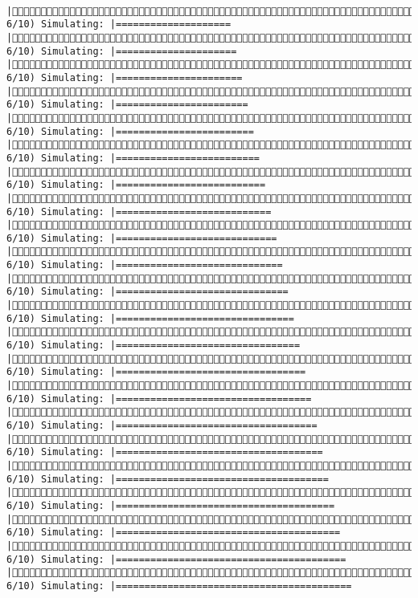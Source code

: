 \documentclass[]{article}
\begin{document}
\begin{verbatim}
             |( 6/10) Simulating: |====================                                 |( 6/10) Simulating: |=====================                                |( 6/10) Simulating: |======================                               |( 6/10) Simulating: |=======================                              |( 6/10) Simulating: |========================                             |( 6/10) Simulating: |=========================                            |( 6/10) Simulating: |==========================                           |( 6/10) Simulating: |===========================                          |( 6/10) Simulating: |============================                         |( 6/10) Simulating: |=============================                        |( 6/10) Simulating: |==============================                       |( 6/10) Simulating: |===============================                      |( 6/10) Simulating: |================================                     |( 6/10) Simulating: |=================================                    |( 6/10) Simulating: |==================================                   |( 6/10) Simulating: |===================================                  |( 6/10) Simulating: |====================================                 |( 6/10) Simulating: |=====================================                |( 6/10) Simulating: |======================================               |( 6/10) Simulating: |=======================================              |( 6/10) Simulating: |========================================             |( 6/10) Simulating: |=========================================            
\end{verbatim}
\end{document}
